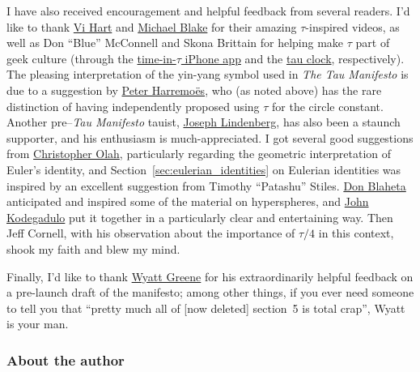 {I have also received encouragement and helpful feedback from several readers. I'd like to thank \href{https://www.youtube.com/watch?v=jG7vhMMXagQ}{Vi Hart} and \href{https://www.youtube.com/watch?v=3174T-3-59Q}{Michael Blake} for their amazing $\tau$-inspired videos, as well as Don ``Blue'' McConnell and Skona Brittain for helping make $\tau$ part of geek culture (through the \href{http://tauclock.com/}{time-in-$\tau$ iPhone app} and the \href{http://www.sbcrafts.net/clocks/}{tau clock}, respectively). The pleasing interpretation of the yin-yang symbol used in \emph{The Tau Manifesto} is due to a suggestion by \href{http://www.harremoes.dk/Peter/}{Peter Harremo\"{e}s}, who (as noted above) has the rare distinction of having independently proposed using $\tau$ for the circle constant. Another pre--\emph{Tau Manifesto} tauist, \href{https://sites.google.com/site/taubeforeitwascool/}{Joseph Lindenberg}, has also been a staunch supporter, and his enthusiasm is much-appreciated. I got several good suggestions from \href{https://christopherolah.wordpress.com/about-me}{Christopher Olah}, particularly regarding the geometric interpretation of Euler's identity, and Section~\ref{sec:eulerian_identities} on Eulerian identities was inspired by an excellent suggestion from Timothy ``Patashu'' Stiles. \href{http://www.blahedo.org/blog/archives/001083.html}{Don Blaheta} anticipated and inspired some of the material on hyperspheres, and \href{http://spikedmath.com/forum/viewtopic.php?f=30&t=147\#p1577}{John Kodegadulo} put it together in a particularly clear and entertaining way. Then Jeff Cornell, with his observation about the importance of $\tau/4$ in this context, shook my faith and blew my mind.

Finally, I'd like to thank \href{https://techiferous.com/}{Wyatt Greene} for his extraordinarily helpful feedback on a pre-launch draft of the manifesto; among other things, if you ever need someone to tell you that ``pretty much all of [now deleted] section~5 is total crap'', Wyatt is your man.



    \subsubsection{About the author} %
    \label{sec:about_the_author}


}
